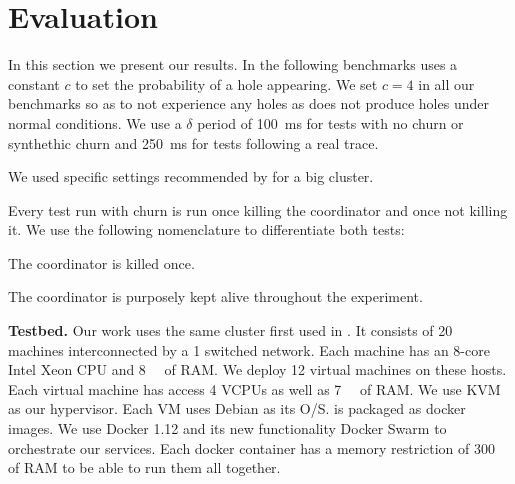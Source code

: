 
\section{Evaluation}
\label{sec:evaluation}
In this section we present our results. In the following benchmarks \epto uses a constant $c$ to set the probability of a hole appearing. We set $c = 4$ in all our benchmarks so as to not experience any holes as \jgroups does not produce holes under normal conditions. We use a $\delta$ period of \SI{100}{\milli\second} for tests with no churn or synthethic churn and \SI{250}{\milli\second} for tests following a real trace.
\par 
We used specific settings recommended by \jgroups for a big cluster.
\par
Every \jgroups test run with churn is run once killing the coordinator and once not killing it. We use the following nomenclature to differentiate both tests:
\begin{description}
	\item[\textbf{\jgroups-coord}:] The coordinator is killed once.
	\item[\textbf{\jgroups-nocoord}:] The coordinator is purposely kept alive throughout the experiment.
\end{description}
\par
\textbf{Testbed.} Our work uses the same cluster first used in \autocite{vaucher2016erasure}. It consists of 20 machines interconnected by a \SI{1}{\gbps} switched network. Each machine has an 8-core Intel Xeon CPU and \SI{8}{\giga\byte} of RAM. We deploy 12 virtual machines on these hosts. Each virtual machine has access 4 VCPUs as well as \SI{7}{\giga\byte} of RAM. We use KVM as our hypervisor. Each VM uses Debian as its O/S. \eptotester is packaged as docker images. We use Docker 1.12 and its new functionality Docker Swarm to orchestrate our services. Each docker container has a memory restriction of \SI{300}{\mega\byte} of RAM to be able to run them all together.
